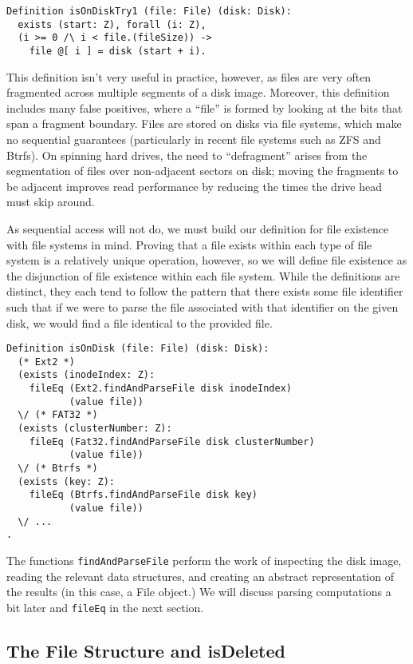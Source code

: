 \documentclass[nocopyrightspace]{sigplanconf}
\begin{document}
\begin{lstlisting}
Definition isOnDiskTry1 (file: File) (disk: Disk):
  exists (start: Z), forall (i: Z),
  (i >= 0 /\ i < file.(fileSize)) -> 
    file @[ i ] = disk (start + i).
\end{lstlisting}

This definition isn't very useful in practice, however, as files are very
often fragmented across multiple segments of a disk image. Moreover, this
definition includes many false positives, where a ``file'' is formed by
looking at the bits that span a fragment boundary. Files are stored on disks
via file systems, which make no sequential guarantees (particularly in recent
file systems such as ZFS and Btrfs). On spinning hard drives, the need to
``defragment'' arises from the segmentation of files over non-adjacent sectors
on disk; moving the fragments to be adjacent improves read performance by
reducing the times the drive head must skip around.

As sequential access will not do, we must build our definition for file
existence with file systems in mind. Proving that a file exists within each
type of file system is a relatively unique operation, however, so we will
define file existence as the disjunction of file existence within each file
system. While the definitions are distinct, they each tend to follow the
pattern that there exists some file identifier such that if we were to parse
the file associated with that identifier on the given disk, we would find a
file identical to the provided file.

\begin{lstlisting}
Definition isOnDisk (file: File) (disk: Disk):
  (* Ext2 *)
  (exists (inodeIndex: Z):
    fileEq (Ext2.findAndParseFile disk inodeIndex)
           (value file))
  \/ (* FAT32 *)
  (exists (clusterNumber: Z):
    fileEq (Fat32.findAndParseFile disk clusterNumber) 
           (value file))
  \/ (* Btrfs *)
  (exists (key: Z):
    fileEq (Btrfs.findAndParseFile disk key)
           (value file))
  \/ ...
.
\end{lstlisting}

The functions {\tt findAndParseFile} perform the work of inspecting the disk
image, reading the relevant data structures, and creating an abstract
representation of the results (in this case, a File object.) We will discuss
parsing computations a bit later and {\tt fileEq} in the next section.

\subsection{The File Structure and isDeleted}
\end{document}
